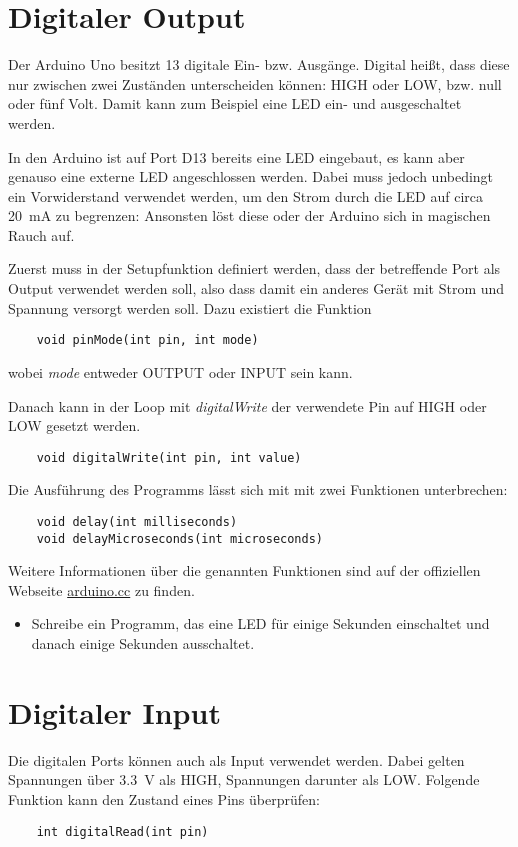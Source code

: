 \documentclass[10pt,a4paper]{article}
\begin{document}
\clearpage
\section{Digitaler Output}
Der Arduino Uno besitzt 13 digitale Ein- bzw. Ausgänge. Digital heißt, dass diese nur zwischen zwei Zuständen unterscheiden können: HIGH oder LOW, bzw. null oder fünf Volt. Damit kann zum Beispiel eine LED ein- und ausgeschaltet werden.

In den Arduino ist auf Port D13 bereits eine LED eingebaut, es kann aber genauso eine externe LED angeschlossen werden. Dabei muss jedoch unbedingt ein Vorwiderstand verwendet werden, um den Strom durch die LED auf circa  \SI{20}{mA} zu begrenzen: Ansonsten löst diese oder der Arduino sich in magischen Rauch auf.
\bigskip

Zuerst muss in der Setupfunktion definiert werden, dass der betreffende Port als Output verwendet werden soll, also dass damit ein anderes Gerät mit Strom und Spannung versorgt werden soll. Dazu existiert die Funktion
\begin{lstlisting}
	void pinMode(int pin, int mode)
\end{lstlisting}
wobei \emph{mode} entweder OUTPUT oder INPUT sein kann.
\bigskip

Danach kann in der Loop mit \emph{digitalWrite} der verwendete Pin auf HIGH oder LOW gesetzt werden.
\begin{lstlisting}
	void digitalWrite(int pin, int value)
\end{lstlisting}
\bigskip

Die Ausführung des Programms lässt sich mit mit zwei Funktionen unterbrechen:
\begin{lstlisting}
	void delay(int milliseconds)
	void delayMicroseconds(int microseconds)
\end{lstlisting}
\bigskip

Weitere Informationen über die genannten Funktionen sind auf der offiziellen Webseite \href{https://www.arduino.cc/reference/de/}{arduino.cc} zu finden.
\begin{itemize}
	\item Schreibe ein Programm, das eine LED für einige Sekunden einschaltet und danach einige Sekunden ausschaltet.
\end{itemize}





\section{Digitaler Input}
\label{DigitalInput}
Die digitalen Ports können auch als Input verwendet werden. Dabei gelten Spannungen über \SI{3.3}{V} als HIGH, Spannungen darunter als LOW. Folgende Funktion kann den Zustand eines Pins überprüfen:
\begin{lstlisting}
	int digitalRead(int pin)
\end{lstlisting}
\end{document}
